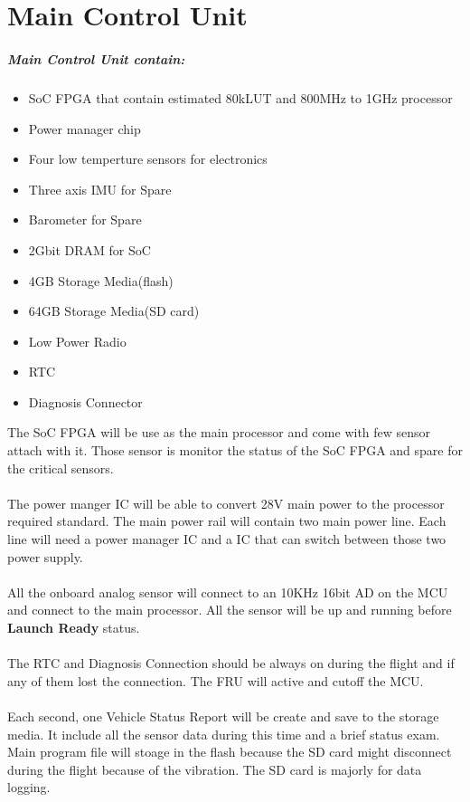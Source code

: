 \documentclass[12pt,article]{memoir}
\begin{document}
\section{Main Control Unit}
\subparagraph{Main Control Unit contain:}
\begin{itemize}
	\item SoC FPGA that contain estimated 80kLUT and 800MHz to 1GHz processor
	\item Power manager chip 
	\item Four low temperture sensors for electronics
	\item Three axis IMU for Spare
	\item Barometer for Spare
	\item 2Gbit DRAM for SoC
	\item 4GB Storage Media(flash)
	\item 64GB Storage Media(SD card)
	\item Low Power Radio
	\item RTC
	\item Diagnosis Connector
\end{itemize}
The SoC FPGA will be use as the main processor and come with few sensor attach with it. Those sensor is monitor the status of the SoC FPGA and spare for the critical sensors.\\\\
The power manger IC will be able to convert 28V main power to the processor required standard. The main power rail will contain two main power line. Each line will need a power manager IC and a IC that can switch between those two power supply.\\\\
All the onboard analog sensor will connect to an 10KHz 16bit AD on the MCU and connect to the main processor. All the sensor will be up and running before \textbf{Launch Ready} status.\\\\
The RTC and Diagnosis Connection should be always on during the flight and if any of them lost the connection. The FRU will active and cutoff the MCU.\\\\
Each second, one Vehicle Status Report will be create and save to the storage media. It include all the sensor data during this time and a brief status exam. Main program file will stoage in the flash because the SD card might disconnect during the flight because of the vibration. The SD card is majorly for data logging.
\end{document}
